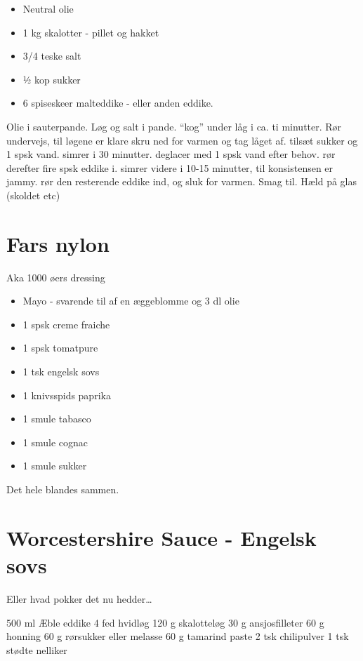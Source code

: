 \documentclass[
]{book}
\providecommand{\tightlist}{%
  \setlength{\itemsep}{0pt}\setlength{\parskip}{0pt}}
\begin{document}
\begin{itemize}
\tightlist
\item
  Neutral olie
\item
  1 kg skalotter - pillet og hakket
\item
  3/4 teske salt
\item
  ½ kop sukker
\item
  6 spiseskeer malteddike - eller anden eddike.
\end{itemize}

Olie i sauterpande.
Løg og salt i pande.
``kog'' under låg i ca. ti minutter. Rør undervejs, til løgene er klare
skru ned for varmen og tag låget af.
tilsæt sukker og 1 spsk vand. simrer i 30 minutter. deglacer med 1 spsk vand efter behov.
rør derefter fire spsk eddike i. simrer videre i 10-15 minutter, til konsistensen er jammy.
rør den resterende eddike ind, og sluk for varmen.
Smag til.
Hæld på glas (skoldet etc)

\section{Fars nylon}\label{fars-nylon}

Aka 1000 øers dressing

\begin{itemize}
\tightlist
\item
  Mayo - svarende til af en æggeblomme og 3 dl olie
\item
  1 spsk creme fraiche
\item
  1 spsk tomatpure
\item
  1 tsk engelsk sovs
\item
  1 knivsspids paprika
\item
  1 smule tabasco
\item
  1 smule cognac
\item
  1 smule sukker
\end{itemize}

Det hele blandes sammen.

\section{Worcestershire Sauce - Engelsk sovs}\label{worcestershire-sauce---engelsk-sovs}

Eller hvad pokker det nu hedder\ldots{}

500 ml Æble eddike
4 fed hvidløg
120 g skalotteløg
30 g ansjosfilleter
60 g honning
60 g rørsukker eller melasse
60 g tamarind paste
2 tsk chilipulver
1 tsk stødte nelliker
\end{document}
